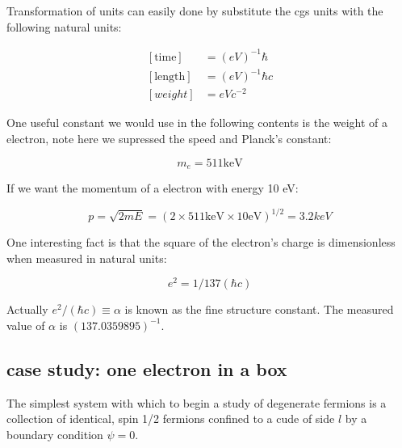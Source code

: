 \documentclass[a4paper, 11pt]{article}
\numberwithin{equation}{subsection}
\begin{document}
    Transformation of units can easily done by substitute the cgs units with the following natural units:

    \begin{equation}
      \begin{aligned}
	[\textrm{time}] &= (eV) ^{-1} \hbar\\
	[\textrm{length}] &= (eV) ^{-1} \hbar c\\
	\left[ weight \right] &= eV c^{-2}
      \end{aligned}
    \end{equation}

    One useful constant we would use in the following contents is the weight of a electron, note here we supressed the speed and Planck's constant:

    \begin{equation}
      m_e = 511  \textrm{keV}
    \end{equation}

    If we want the momentum of a electron with energy 10 eV:

    \begin{equation}
      p = \sqrt{2 m E} = (2 \times 511 \textrm{keV} \times 10 \textrm{eV}) ^{1/2} = 3.2 keV
    \end{equation}

    One interesting fact is that the square of the electron's charge is dimensionless when measured in natural units:

    \begin{equation}
      e ^2 = 1/137 (\hbar c)
    \end{equation}

    Actually $e^2 / (\hbar c) \equiv \alpha$ is known as the fine structure constant. The measured value of $\alpha$ is $(137.0359895)^{-1}$.

  \subsection{case study: one electron in a box}

    The simplest system with which to begin a study of degenerate fermions is a collection of identical, spin 1/2 fermions confined to a cude of side $l$ by a boundary condition $\psi = 0$. 





\newpage

\end{document}

